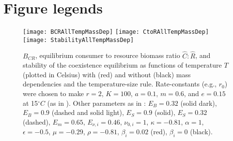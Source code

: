 \documentclass[11pt]{article}
\begin{document}




\newpage{}


\section*{Figure legends}


\begin{figure}[!ht]
\centering
\texttt{[image: BCRAllTempMassDep]}
\texttt{[image: CtoRAllTempMassDep]}
\texttt{[image: StabilityAllTempMassDep]}
\caption{
$B_{CR}$, equilibrium consumer to resource biomass ratio $\hat{C}:\hat{R}$, and stability of the coexistence equilibrium as functions of temperature $T$ (plotted in Celsius) with (red) and without (black) mass dependencies and the temperature-size rule.
Rate-constants (e.g., $r_0$) were chosen to make $r = 2$, $K = 100$, $a = 0.1$, $m = 0.6$, and $e = 0.15$ at 15$^\circ C$ (as in \cite{Gilbert2014}).
Other parameters as in \cite{Gilbert2014,DeLong2015}: $E_B = 0.32$ (solid dark), $E_B = 0.9$ (dashed and solid light), $E_S = 0.9$ (solid), $E_S = 0.32$ (dashed), $E_m = 0.65$, $E_{\nu,i} = 0.46$, $\nu_{0,i} = 1$, $\kappa = -0.81$, $\alpha = 1$, $\epsilon = -0.5$, $\mu = -0.29$, $\rho = -0.81$, $\beta_i = 0.02$ (red), $\beta_i = 0$ (black).  
}
\label{AllTempMassDep}
\end{figure}
\end{document}
